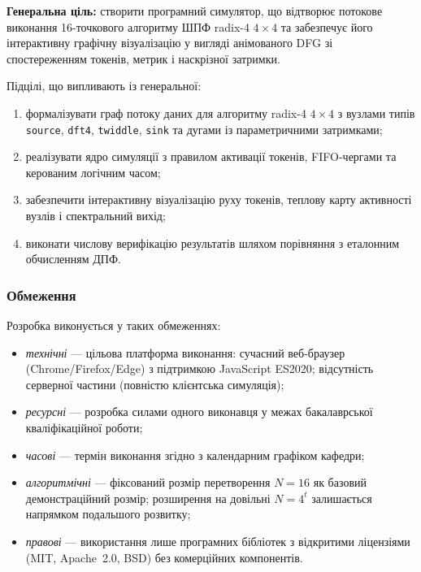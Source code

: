 \textbf{Генеральна ціль:} створити програмний симулятор, що
відтворює потокове виконання 16-точкового алгоритму ШПФ
radix-4 $4\times4$ та забезпечує його інтерактивну графічну
візуалізацію у вигляді анімованого DFG зі спостереженням токенів,
метрик і наскрізної затримки.

Підцілі, що випливають із генеральної:
\begin{enumerate}
  \item формалізувати граф потоку даних для алгоритму radix-4
        $4\times4$ з вузлами типів \texttt{source}, \texttt{dft4},
        \texttt{twiddle}, \texttt{sink} та дугами із параметричними
        затримками;
  \item реалізувати ядро симуляції з правилом активації токенів,
        FIFO-чергами та керованим логічним часом;
  \item забезпечити інтерактивну візуалізацію руху токенів,
        теплову карту активності вузлів і спектральний вихід;
  \item виконати числову верифікацію результатів шляхом порівняння
        з еталонним обчисленням ДПФ.
\end{enumerate}

\subsubsection*{Обмеження}

Розробка виконується у таких обмеженнях:

\begin{itemize}
  \item \textit{технічні} --- цільова платформа виконання: сучасний
        веб-браузер (Chrome/Firefox/Edge) з підтримкою JavaScript
        ES2020; відсутність серверної частини (повністю клієнтська
        симуляція);
  \item \textit{ресурсні} --- розробка силами одного виконавця
        у межах бакалаврської кваліфікаційної роботи;
  \item \textit{часові} --- термін виконання згідно з календарним
        графіком кафедри;
  \item \textit{алгоритмічні} --- фіксований розмір перетворення
        $N = 16$ як базовий демонстраційний розмір; розширення на
        довільні $N = 4^t$ залишається напрямком подальшого розвитку;
  \item \textit{правові} --- використання лише програмних бібліотек
        з відкритими ліцензіями (MIT, Apache~2.0, BSD) без
        комерційних компонентів.
\end{itemize}

